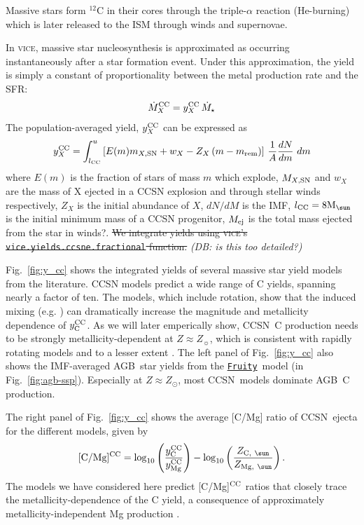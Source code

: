 \documentclass[fleqn,
usenatbib]{mnras}
\makeatletter
\newcommand{\VICE}{\textsc{vice}}
\newcommand{\fruity}{\texttt{\hyperlink{fruity}{Fruity}}}
\newcommand{\agb}{AGB}
\newcommand{\cc}{CCSN}
\newcommand{\Ycc}{{y_{\rm C}^{\rm CC}}}
\newcommand{\Yoc}{{y_{\rm Mg}^{\rm CC}}}
\newcommand{\Mo}{ {\rm M}_{\sun}}
\newcommand{\Zo}{ Z_{\sun}}
\DeclareRobustCommand\citepos
  {\begingroup
   \let\NAT@nmfmt\NAT@posfmt%
   \NAT@swafalse\let\NAT@ctype\z@\NAT@partrue
   \@ifstar{\NAT@fulltrue\NAT@citetp}{\NAT@fullfalse\NAT@citetp}}
\let\NAT@orig@nmfmt\NAT@nmfmt
\def\NAT@posfmt#1{\NAT@orig@nmfmt{#1's}}
\newcommand{\dbstrike}[1]{{\color{Thistle} \sout{#1} }}
\newcommand{\dbadd}[1]{{\color{Thistle} #1}}
\newcommand{\dbnote}[1]{ {\color{Thistle} \textit{\small (DB: #1)}} }
\makeatother
\begin{document}
Massive stars form $^{12}$C in their cores through the triple-$\alpha$ reaction \dbadd{(He-burning)} which is later released to the ISM through winds and supernovae.

In \VICE, massive star nucleosynthesis is approximated as occurring instantaneously after a star formation event. Under this approximation, the yield is simply a constant  of proportionality between the metal production rate and the SFR:
\begin{equation}
    \dot{M}_X^{\rm CC} = y_{X}^{\rm CC}\, \dot{M}_\star
\end{equation}
The population-averaged yield, $y_{X}^{\rm CC}$ can be expressed as
\begin{equation}
y_{X}^{\rm CC} = \int_{l_{\rm CC}}^{u} \left[E(m) m_{X\rm, SN} + w_X - Z_X\,(m-m_{\rm rem})\right]\,\frac{1}{A} \frac{dN}{dm}\ dm
\end{equation}
where $E(m)$ is the fraction of stars of mass $m$ which explode, $M_{X,\rm SN}$ and $w_X$ are the mass of X ejected in a CCSN explosion and through stellar winds respectively, $Z_X$ is the initial abundance of $X$, $dN/dM$ is the IMF, $l_{\rm CC}=8\Mo$ is the initial minimum mass of a CCSN progenitor, $M_{\rm ej}$ is the total mass ejected from the star in winds?. \dbstrike{We integrate yields using \VICE's {\tt vice.yields.ccsne.fractional} function.} \dbnote{is this too detailed?}

Fig.~\ref{fig:y_cc} shows the integrated yields of several massive star yield models from the literature. 
\cc{} models predict a wide range of C yields, spanning nearly a factor of ten. 
 The \cite{LC18} models, which include rotation, show that the induced mixing (e.g. \citealt{frischknecht+16}) can dramatically increase the magnitude and metallicity dependence of $\Ycc$. As we will later emperically show, \cc\ C production needs to be strongly metallicity-dependent at $Z \approx \Zo$, which is consistent with \citepos{LC18} rapidly rotating models and to a lesser extent \citet{NKT13}.
The left panel of Fig.~\ref{fig:y_cc} also shows the IMF-averaged \agb\ star yields from the \fruity\ model (in Fig.~\ref{fig:agb-ssp}). Especially at $Z\approx Z_\odot$, most \cc\ models dominate \agb\ C production. 


The right panel of Fig.~\ref{fig:y_cc} shows the average [C/Mg] ratio of \cc\ ejecta for the different models, given by
\begin{equation}\label{eq:c_mg_cc}
    {\rm [C/Mg]^{CC}} = \log_{10}\left( \frac{\Ycc}{\Yoc}\right) - \log_{10} \left( \frac{Z_{{\rm C},\ \sun }}{Z_{{\rm Mg},\ \sun }} \right).
\end{equation}
The models we have considered here predict [C/Mg]$^{\rm CC}$ ratios that closely trace the metallicity-dependence of the C yield, a consequence of approximately
metallicity-independent Mg production \citep[e.g][]{andrews+17}.
\end{document}
